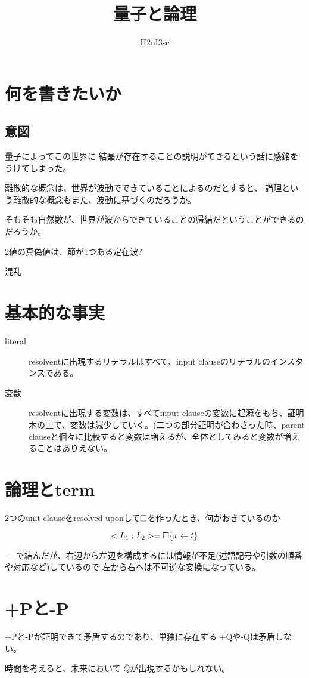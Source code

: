 \documentclass[10pt, oneside]{jarticle}   	%
\title{量子と論理}
\author{H2nI3sc}
\date{}							%
\begin{document}
\maketitle

\section{何を書きたいか}
\subsection{意図}

量子によってこの世界に 結晶が存在することの説明ができるという話に感銘をうけてしまった。

離散的な概念は、世界が波動でできていることによるのだとすると、
論理という離散的な概念もまた、波動に基づくのだろうか。

そもそも自然数が、世界が波からできていることの帰結だということができるのだろうか。

2値の真偽値は、節が1つある定在波?

混乱

% 

\section{基本的な事実}
\begin{description}
\item[ literal ] resolventに出現するリテラルはすべて、input clauseのリテラルのインスタンスである。
\item[ 変数 ] resolventに出現する変数は、すべてinput clauseの変数に起源をもち、証明木の上で、変数は減少していく。(二つの部分証明が合わさった時、parent clauseと個々に比較すると変数は増えるが、全体としてみると変数が増えることはありえない。

\end{description}

\section{論理とterm}
2つのunit clauseをresolved uponして$\Box$を作ったとき、何がおきているのか

$$<L_1:L_2> = \Box\{x \leftarrow t\}$$

$=$で結んだが、右辺から左辺を構成するには情報が不足(述語記号や引数の順番や対応など)しているので
左から右へは不可逆な変換になっている。



\section{+Pと-P}
+Pと-Pが証明できて矛盾するのであり、単独に存在する +Qや-Qは矛盾しない。

時間を考えると、未来において $\bar{Q}$が出現するかもしれない。
\end{document}
